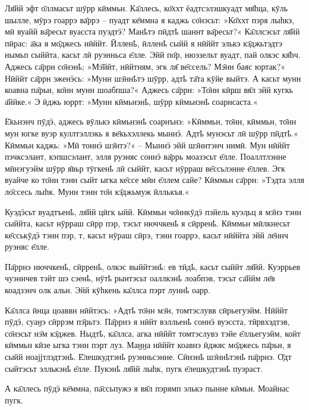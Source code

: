 \documentclass[10pt, a5paper,openany,twoside]{ksdp}
\begin{document}
 \setlength{\RaggedRightParindent}{.5cm}\begin{RaggedRight}

\noindent Ля̄йй эфт о̄ллмасьт шӯрр кӣммьн. Ка̄ллесь, ко̄ххт ёадтсэлэшкуадт мя̄һца, кӯль шылле, мӯрэ гоаррэ ва̄ррэ – пуадт ке̄ммна я каджь со̄нэсьт: »Ко̄ххт пэря лыһкэ, мӣ вуайй ва̄ресьт вуасста пуэдтӭ? Манҍтэ пӣдтҍ шаннт ва̄ресьт?« Ка̄ллсэсьт ля̄йй пӣрас: а̄ка я мо̄джесь нӣййт. Ӣлленҍ, ӣлленҍ сыйй я нӣййт элькэ кэ̄джьтэдтэ нымьп сыййта, касьт лӣ руэнньса е̄лле. Эйй по̄р, нюэзельт вуадт, пай олкэс кя̄һч. Аджесь са̄ррн со̄нэнҍ; »Мэ̄ййт, нӣйтням, эгк ля̄ ве̄ссель? Мэ̄нн баяс юртак?« Нӣййт са̄ррн эженӭсь: »Мунн шэ̄ннҍтэ шӯрр, адтҍ та̄та кӯйе выйтэ. А касьт мунн коавна па̄рьн, ко̄нн мунн шоабпша?« Аджесь са̄ррн: »То̄нн кӣҏш вя̄л эйй кугкь а̄ййке.« Э ӣджь юррт: »Мунн кӣмьнэнҍ, шӯрр кӣмьнэнҍ соарнсаста.« 

Е̄кьнэнч пӯдӭ, аджесь вӯлькэ кӣмьнэнҍ соарнънэ: »Кӣммьн, то̄нн, кӣммьн, то̄нн мун югке вуэр куллтэллэкь я ве̄кьхэллекь мыннӭ. Адтҍ мунэсьт лӣ шӯрр пӣдтҍ.« Кӣммьн каджь: »Мӣ тоннӭ шэ̄нтэ?« – Мыннӭ эйй шэ̄ннтэнч нимӣ. Мун нӣййт пэчксэлант, кэпшсэлант, элля руэняс соннӭ ва̄ррь моазэсьт е̄лле. Поаллтлэнне мӣнэгуэйм шӯрр я̄вьр тӯгкенҍ лӣ сыййт, касьт нӯрраш ве̄ссьлэнне е̄ллев. Эгк вуайче ко то̄нн тэнн сыйт ыгка ке̄ссе мӣн е̄ллем сайе? Кӣммьн са̄ррн: »Тэдта элля ло̄ссесь лыһк. Мунн тэнн то̄н кэ̄джьмуж ӣллькъя.« 

Куэдӭсьт вуадтъенҍ, ля̄йй цӣгк ыйй. Кӣммьн чо̄ннкӯдӭ пэйель куэӆьц я мэ̄нэ тэнн сыййта, касьт нӯрраш сӣрр пэр, тэсьт нюччкенҍ я сӣрренҍ. Кӣммьн мӣлкнесьт ке̄сськӯдӭ тэнн пэр, т, касьт нӯраш сӣрэ, тэнн гоаррэ, касьт нӣййта эйй ле̄ннч руэняс е̄лле. 

Па̄ррнэ нюччкенҍ, сӣрренҍ, олкэс выййтэнҍ: ев тӣдҍ, касьт сыййт ля̄йй. Куэррьев чуэннчев тэйт шэ сэенҍ, нӯтҍ рынтэсьт оаллкэнҍ лоабпэв, тэсьт са̄ййм ле̄в коадзэнч олк альн. Эйй кӯһкень ка̄ллса пэҏт луннҍ оарр. 

\enlargethispage{5\baselineskip}
Ка̄ллса ӣнца цоаввн нӣйтэсь: »Адтҍ то̄нн мэ̄н, томтэслувв сӣрьегуэйм. Нӣййт пӯдӭ, суаӈэ сӣррэм пэ̄ҏьтэ. Па̄ррнэ я нӣйт вэлльенҍ соннӭ вуэсста, тӣрвхэдтэв, со̄нэсьт нэ̄м кэ̄джев. Ныдтҍ, ка̄ллса, агка нӣййт томтэслувэ тэйе е̄лльегуэйм, койт кӣммьн кӣзе ыгка тэнн пэҏт луз. Маӈӈа нӣййт коавнэ ӣджяс мо̄джесь па̄рьн, я сыйй ноајјтлэдтэнҍ. Е̄лешкудтэнҍ руэнньсэнне. Сӣнэнҍ шэ̄ннҍтэнҍ па̄ррнэ. О̄дт сыйтэсьт эллькэнҍ е̄лле. Пукэнҍ ля̄йй лыһк, пугк е̄лешкудтэнҍ пуэраст. 

А ка̄ллесь пӯдӭ ке̄ммна, па̄ссьпужэ я вя̄л пэрямп элькэ пынне кӣмьн. Моайнас пугк. 

\end{RaggedRight}\setlength{\RaggedRightParindent}{0cm}
\end{document}
